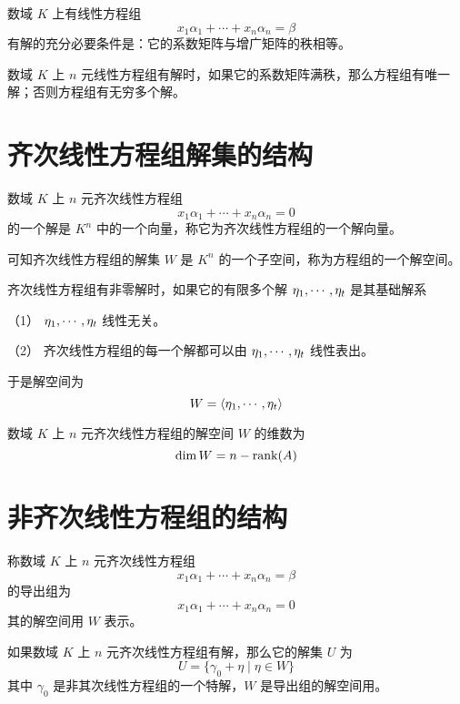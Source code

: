 \begin{theorem}
	数域 $K$ 上有线性方程组
	\[x_1\alpha_1 + \cdots + x_n\alpha_n = \beta\]
	有解的充分必要条件是：它的系数矩阵与增广矩阵的秩相等。
\end{theorem}

\begin{theorem}
	数域 $K$ 上 $n$ 元线性方程组有解时，如果它的系数矩阵满秩，那么方程组有唯一解；否则方程组有无穷多个解。
\end{theorem}

\section{齐次线性方程组解集的结构}

数域 $K$ 上 $n$ 元齐次线性方程组
\[x_1\alpha_1 + \cdots + x_n\alpha_n = 0\]
的一个解是 $K^n$ 中的一个向量，称它为齐次线性方程组的一个解向量。

可知齐次线性方程组的解集 $W$ 是 $K^n$ 的一个子空间，称为方程组的一个解空间。

\begin{definition}
	齐次线性方程组有非零解时，如果它的有限多个解 $\eta_1,\cdots,\eta_t$ 是其基础解系

	（1） $\eta_1,\cdots,\eta_t$ 线性无关。

	（2） 齐次线性方程组的每一个解都可以由 $\eta_1,\cdots,\eta_t$ 线性表出。
\end{definition}

于是解空间为
\[W = \langle \eta_1,\cdots,\eta_t \rangle\]

\begin{theorem}
	数域 $K$ 上 $n$ 元齐次线性方程组的解空间 $W$ 的维数为
	\[\dim W = n-\operatorname{rank}(A)\]
\end{theorem}

\section{非齐次线性方程组的结构}

称数域 $K$ 上 $n$ 元齐次线性方程组
\[x_1\alpha_1 + \cdots + x_n\alpha_n = \beta\]
的导出组为
\[x_1\alpha_1 + \cdots + x_n\alpha_n = 0\]
其的解空间用 $W$ 表示。

\begin{theorem}
	如果数域 $K$ 上 $n$ 元齐次线性方程组有解，那么它的解集 $U$ 为
	\[U = \{\gamma_0+\eta \mid \eta \in W\}\]
	其中 $\gamma_0$ 是非其次线性方程组的一个特解，$W$ 是导出组的解空间用。
\end{theorem}